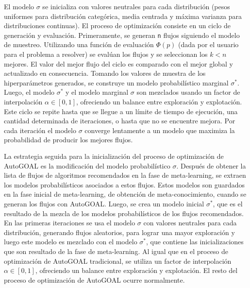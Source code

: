 El modelo $\sigma$ se inicializa con valores neutrales para cada distribución (pesos uniformes para distribución categórica, media centrada y máxima varianza para distribuciones continuas). El proceso de optimización consiste en un ciclo de generación y evaluación. Primeramente, se generan \texttt{n} flujos siguiendo el modelo de muestreo. Utilizando una función de evaluación $\Phi(p)$ (dada por el usuario para el problema a resolver) se evalúan los flujos y se seleccionan los $k < n$ mejores. El valor del mejor flujo del ciclo es comparado con el mejor global y actualizado en consecuencia. Tomando los valores de muestra de los hiperparámetros generados, se construye un modelo probabilístico marginal $\sigma^*$. Luego, el modelo $\sigma^*$ y el modelo marginal $\sigma$ son mezclados usando un factor de interpolación $\alpha \in [0, 1]$, ofreciendo un balance entre exploración y explotación. Este ciclo se repite hasta que se llegue a un límite de tiempo de ejecución, una cantidad determinada de iteraciones, o hasta que no se encuentre mejora. Por cada iteración el modelo $\sigma$ converge lentamente a un modelo que maximiza la probabilidad de producir los mejores flujos. 

La estrategia seguida para la inicialización del proceso de optimización de AutoGOAL es la modificación del modelo probabilístico $\sigma$. Después de obtener la lista de flujos de algoritmos recomendados en la fase de meta-learning, se extraen los modelos probabilísticos asociados a estos flujos. Estos modelos son guardados en la fase inicial de meta-learning, de obtención de meta-conocimiento, cuando se generan los flujos con AutoGOAL. Luego, se crea un modelo inicial $\sigma^*$, que es el resultado de la mezcla de los modelos probabilísticos de los flujos recomendados. En las primeras iteraciones se usa el modelo $\sigma$ con valores neutrales para cada distribución, generando flujos aleatorios, para lograr una mayor exploración y luego este modelo es mezclado con el modelo $\sigma^*$, que contiene las inicializaciones que son resultado de la fase de meta-learning. Al igual que en el proceso de optimización de AutoGOAL tradicional, se utiliza un factor de interpolación $\alpha \in [0, 1]$, ofreciendo un balance entre exploración y explotación. El resto del proceso de optimización de AutoGOAL ocurre normalmente.

